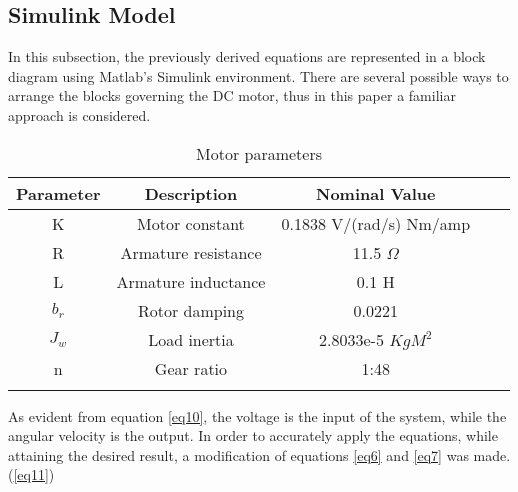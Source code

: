 \subsection{Simulink Model} \label{dc_model}

In this subsection, the previously derived equations are represented in a block diagram using Matlab's Simulink environment. There are several possible ways to arrange the blocks governing the DC motor, thus in this paper a familiar approach is considered.

\begin{table}[h]
\centering
\begin{tabular}{cccll}
\hline
Parameter                   & Description                               & Nominal Value                                 &  &  \\ \hline
\multicolumn{1}{|c|}{K}     & \multicolumn{1}{c|}{Motor constant}       & \multicolumn{1}{c|}{0.1838 V/(rad/s)  Nm/amp} &  &  \\ \cline{1-3}
\multicolumn{1}{|c|}{R}     & \multicolumn{1}{c|}{Armature resistance}  & \multicolumn{1}{c|}{11.5 $\Omega$}            &  &  \\ \cline{1-3}
\multicolumn{1}{|c|}{L}     & \multicolumn{1}{c|}{Armature inductance}  & \multicolumn{1}{c|}{0.1 H}                    &  &  \\ \cline{1-3}
\multicolumn{1}{|c|}{$b_r$} & \multicolumn{1}{c|}{Rotor damping}        & \multicolumn{1}{c|}{0.0221}                   &  &  \\ \cline{1-3}
\multicolumn{1}{|c|}{$J_w$} & \multicolumn{1}{c|}{Load inertia} & \multicolumn{1}{c|}{2.8033e-5 $KgM^2$}        &  &  \\ \cline{1-3}
\multicolumn{1}{|c|}{n}     & \multicolumn{1}{c|}{Gear ratio}           & \multicolumn{1}{c|}{1:48}                     &  &  \\ \cline{1-3}
\multicolumn{1}{l}{}        & \multicolumn{1}{l}{}                      & \multicolumn{1}{l}{}                          &  &  \\ \hline
\end{tabular}
\caption{Motor parameters}
\label{motor_par}
\end{table}

As evident from equation \ref{eq10}, the voltage is the input of the system, while the angular velocity is the output. In order to accurately apply the equations, while attaining the desired result, a modification of equations \ref{eq6} and \ref{eq7} was made.(\ref{eq11})

